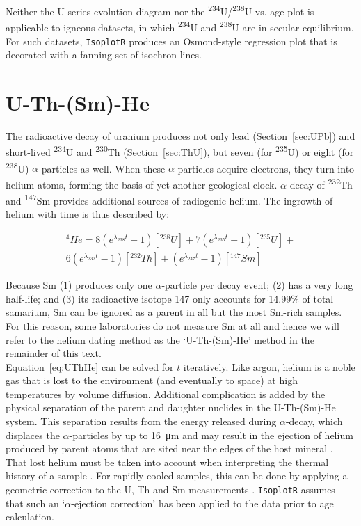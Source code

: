 \documentclass{article}
\begin{document}
Neither the U-series evolution diagram nor the
\textsuperscript{234}U/\textsuperscript{238}U vs. age plot is
applicable to igneous datasets, in which \textsuperscript{234}U and
\textsuperscript{238}U are in secular equilibrium.  For such datasets,
\texttt{IsoplotR} produces an Osmond-style regression plot that is
decorated with a fanning set of isochron lines.

\section{U-Th-(Sm)-He}
\label{sec:UThHe}

The radioactive decay of uranium produces not only lead
(Section~\ref{sec:UPb}) and short-lived \textsuperscript{234}U and
\textsuperscript{230}Th (Section~\ref{sec:ThU}), but seven (for
\textsuperscript{235}U) or eight (for \textsuperscript{238}U)
$\alpha$-particles as well.  When these $\alpha$-particles acquire
electrons, they turn into helium atoms, forming the basis of yet
another geological clock. $\alpha$-decay of \textsuperscript{232}Th
and \textsuperscript{147}Sm provides additional sources of radiogenic
helium.  The ingrowth of helium with time is thus described by:

\begin{equation}
  \begin{split}
  {}^{4}He = 8 \left(e^{\lambda_{238}t} -1\right)[{}^{238}U] +
       7 \left(e^{\lambda_{235}t} -1\right)[{}^{235}U] + \\
  6 \left(e^{\lambda_{232}t} -1\right) [{}^{232}Th] +
  \left(e^{\lambda_{247}t} -1 \right) [{}^{147}Sm]
  \end{split}
  \label{eq:UThHe}
\end{equation}

Because Sm (1) produces only one $\alpha$-particle per decay event;
(2) has a very long half-life; and (3) its radioactive isotope 147
only accounts for 14.99\% of total samarium, Sm can be ignored as a
parent in all but the most Sm-rich samples. For this reason, some
laboratories do not measure Sm at all and hence we will refer to the
helium dating method as the `U-Th-(Sm)-He' method in the remainder of
this text.\\

Equation~\ref{eq:UThHe} can be solved for $t$ iteratively. Like argon,
helium is a noble gas that is lost to the environment (and eventually
to space) at high temperatures by volume diffusion.  Additional
complication is added by the physical separation of the parent and
daughter nuclides in the U-Th-(Sm)-He system. This separation results
from the energy released during $\alpha$-decay, which displaces the
$\alpha$-particles by up to \SI{16}{\micro\metre} and may result in
the ejection of helium produced by parent atoms that are sited near
the edges of the host mineral \citep{farley1996}. That lost helium
must be taken into account when interpreting the thermal history of a
sample \citep{meesters2002b}. For rapidly cooled samples, this can be
done by applying a geometric correction to the U, Th and
Sm-measurements \citep{ketcham2011}.  \texttt{IsoplotR} assumes that
such an `$\alpha$-ejection correction' has been applied to the data
prior to age calculation.\\
\end{document}
